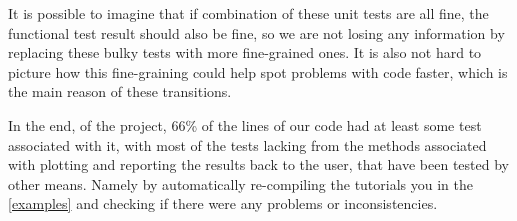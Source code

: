It is possible to imagine that if combination of these unit tests are all fine, the functional test result should also be fine, so we are not losing any information by replacing these bulky tests with more fine-grained ones. It is also not hard to picture how this fine-graining could help spot problems with code faster, which is the main reason of these transitions. 

In the end, of the project, 66\% of the lines of our code had at least some test associated with it, with most of the tests lacking from the methods associated with plotting and reporting the results back to the user, that have been tested by other means. Namely by automatically re-compiling the tutorials you in the \autoref{examples} and checking if there were any problems or inconsistencies.
